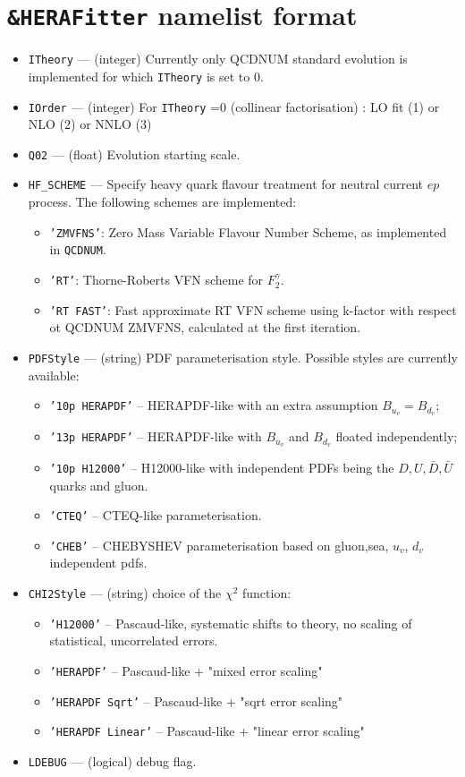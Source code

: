 \documentclass[11pt,a4paper]{article}
\begin{document}
\section{{\tt \&HERAFitter} namelist format}
\label{sec:herafitter}
\begin{itemize}
  \item {\tt ITheory} --- (integer) Currently only QCDNUM standard evolution
     is implemented for which {\tt ITheory} is set to 0.
  \item {\tt IOrder} --- (integer) For {\tt ITheory} =0 (collinear factorisation) : 
        LO fit (1) or NLO (2) or NNLO (3) 
  \item {\tt Q02} --- (float) Evolution starting scale.
  \item {\tt HF\_SCHEME} --- Specify heavy quark flavour treatment for neutral
 current $ep$ process. The following schemes are implemented: 
    \begin{itemize}
      \item {\tt 'ZMVFNS'}: Zero Mass Variable Flavour Number Scheme, as implemented
 in {\tt QCDNUM}.
      \item {\tt 'RT'}: Thorne-Roberts VFN scheme for $F_2^{\gamma}$. 
      \item {\tt 'RT FAST'}: Fast approximate RT VFN scheme using k-factor 
with respect ot QCDNUM ZMVFNS, calculated at the first iteration.
    \end{itemize}
\item {\tt PDFStyle} --- (string) PDF parameterisation style. Possible styles are currently available:
   \begin{itemize}
  \item{\tt '10p HERAPDF'} -- HERAPDF-like with an extra assumption 
                                 $B_{u_v} = B_{d_v}$;
  \item{\tt '13p HERAPDF'} -- HERAPDF-like with $B_{u_v}$ and $B_{d_v}$ 
                          floated independently;
  \item{\tt '10p H12000'}  -- H12000-like with independent PDFs being the
               $D,U,\bar{D},\bar{U}$ quarks and gluon.
  \item{\tt 'CTEQ'}        -- CTEQ-like parameterisation.
  \item{\tt 'CHEB'}        -- CHEBYSHEV parameterisation based on 
         gluon,sea, $u_{v}$, $d_{v}$ independent pdfs.
 \end{itemize}
\item {\tt CHI2Style}  --- (string) choice of the $\chi^2$ function:
   \begin{itemize}
   \item {\tt 'H12000'} -- Pascaud-like, systematic shifts to theory, no scaling of statistical, uncorrelated errors.
   \item {\tt 'HERAPDF'} -- Pascaud-like + "mixed error scaling"
   \item {\tt 'HERAPDF Sqrt'}   -- Pascaud-like + "sqrt error scaling"
   \item {\tt 'HERAPDF Linear'} -- Pascaud-like + "linear error scaling"
 \end{itemize}
  \item {\tt LDEBUG}  --- (logical) debug flag.
\end{itemize}
\end{document}
